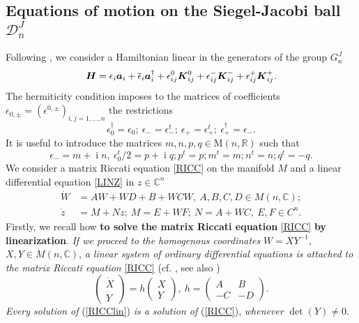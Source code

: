 \documentclass[12pt]{amsart}
\numberwithin{equation}{section}
\theoremstyle{definition}
\begin{document}
\subsection{Equations of motion on the Siegel-Jacobi ball
  ${{\mathcal{{D}}}}^J_n$}\label{lasst} 
Following \cite{nou}, we  consider  a  Hamiltonian linear in the generators of
the group $G^J_n$ 
\begin{equation}\label{HACA}
{{\mbox{\boldmath{${H}$}}}}= \epsilon_i{{\mbox{\boldmath{${a}$}}}}_i+\overline{\epsilon}_i{{\mbox{\boldmath{${a}$}}}}_i^{\dagger} +  
\epsilon^0_{ij}{{\mbox{\boldmath{${K}$}}}}^0_{ij}+
\epsilon^-_{ij}{{\mbox{\boldmath{${K}$}}}}^-_{ij}+\epsilon^+_{ij}{{\mbox{\boldmath{${K}$}}}}^+_{ij}. 
\end{equation}
 The hermiticity condition imposes to the matrices of  coefficients $\epsilon_{0,\pm}=(\epsilon^{0,\pm})_{i,j=1,\dots,n} $  the restrictions
\begin{equation}\label{CONDI}
\epsilon_0^{\dagger}=\epsilon_0; ~\epsilon_-=\epsilon_-^t;~
\epsilon_+=\epsilon_+^t; ~ \epsilon_+^{\dagger}=\epsilon_-.
\end{equation}
It is useful to introduce   the matrices $m,n,p,q\in\text{M}(n,{\ensuremath{\mathbb{R}}})$
such that 
\begin{equation}\label{epsmn}
\epsilon_-=m+{\operatorname{i}} n, ~
  \epsilon_0^t/2=p+{\operatorname{i}} q; p^t=p; m^t= m; n^t =n; q^t=-q.
\end{equation} 
We consider 
 a matrix Riccati equation \eqref{RICC} on the manifold $M$ and a linear differential
equation \eqref{LINZ}  in $z\in{\ensuremath{\mathbb{C}}}^n$
  \begin{subequations}\label{TOTAL}
\begin{align}
\dot{W} & =AW+WD+B+WCW, ~A,B,C,D\in M(n,{\ensuremath{\mathbb{C}}}); \label{RICC}\\
\dot{z} & = M+Nz; ~M= E+WF; ~ N= A+WC, ~E,F\in C^n. \label{LINZ}
\end{align}
\end{subequations}
Firstly, we recall  how {\bf to solve the matrix Riccati
equation} \eqref{RICC}  {\bf by linearization}.
{\it If we proceed to the homogenous coordinates} $W=XY^{-1}$, $X,Y\in
M(n,{\ensuremath{\mathbb{C}}})$,  {\it a linear
system of ordinary differential equations is attached to the matrix
Riccati equation} \eqref{RICC} (cf. \cite{levin}, see also \cite{sbl})
\begin{equation}\label{RICClin}
\left( \begin{array}{c}\dot{X}\\\dot{Y}\end{array}\right)=h
\left( \begin{array}{c}{X}\\{Y}\end{array}\right), ~
h=\left(\begin{array}{cc} A & B\\ -C & -D \end{array}\right) . 
\end{equation}
{\it Every solution of} (\ref{RICClin}) {\it is a solution of} (\ref{RICC}),
{\it whenever} $\det (Y)\not=0$. 
\end{document}
